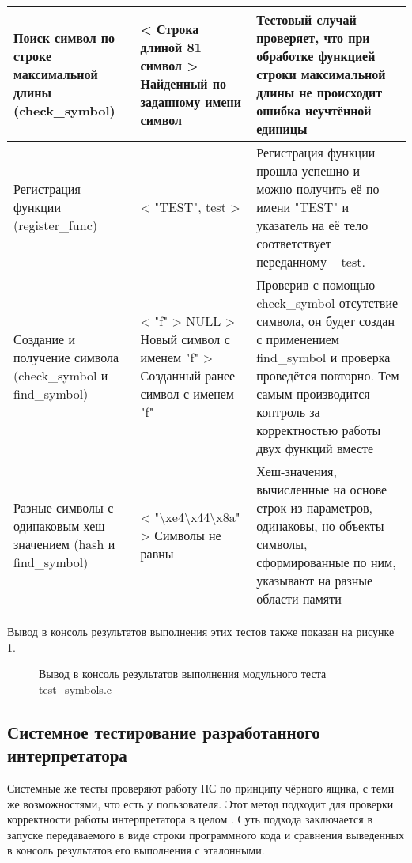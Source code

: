 \begin{xltabular}{\textwidth}{|p{4cm}|p{4cm}|X|}
	Поиск символ по строке максимальной длины (check\_symbol) & < Строка длиной 81 символ \linebreak > Найденный по заданному имени символ & Тестовый случай проверяет, что при обработке функцией строки максимальной длины не происходит ошибка неучтённой единицы \\ \hline
	Регистрация функции (register\_func) & < "TEST", test \linebreak > & Регистрация функции прошла успешно и можно получить её по имени "TEST" и указатель на её тело соответствует переданному -- test. \\ \hline
	Создание и получение символа (check\_symbol и find\_symbol) & < "f" \linebreak > NULL \linebreak > Новый символ с именем "f" \linebreak > Созданный ранее символ с именем "f" & Проверив с помощью check\_symbol отсутствие символа, он будет создан с применением find\_symbol и проверка проведётся повторно. Тем самым производится контроль за корректностью работы двух функций вместе \\ \hline
	Разные символы с одинаковым хеш-значением (hash и find\_symbol)& <     "\textbackslash xe4\textbackslash x44\textbackslash x8a" \linebreak > Символы не равны & Хеш-значения, вычисленные на основе строк из параметров, одинаковы, но объекты-символы, сформированные по ним, указывают на разные области памяти
\end{xltabular}

Вывод в консоль результатов выполнения этих тестов также показан на рисунке \ref{modul_test_res:image}.
\begin{figure}[H]
	\caption{Вывод в консоль результатов выполнения модульного теста test\_symbols.c}
	\label{modul_test_res:image}
\end{figure}

\subsection{Системное тестирование разработанного интерпретатора}

Системные же тесты проверяют работу ПС по принципу чёрного ящика, с теми же возможностями, что есть у пользователя. Этот метод подходит для проверки корректности работы интерпретатора в целом \cite{e15}. Суть подхода заключается в запуске передаваемого в виде строки программного кода и сравнения выведенных в консоль результатов его выполнения с эталонными.

